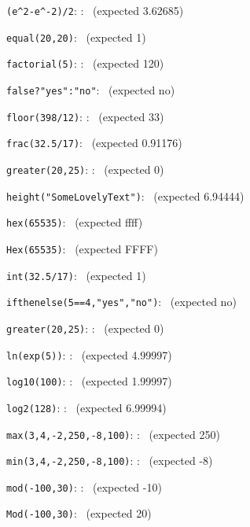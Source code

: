 \documentclass{article}
\begin{document}
\verb|(e^2-e^-2)/2|:
    :
   \pgfmathresult\ (expected  3.62685)

\verb|equal(20,20)|:
   \pgfmathresult\ (expected  1)

\verb|factorial(5)|:
    :
   \pgfmathresult\ (expected  120)

\verb|false?"yes":"no"|:
   \pgfmathresult\ (expected  no)

\verb|floor(398/12)|:
    :
   \pgfmathresult\ (expected  33)

\verb|frac(32.5/17)|:
   \pgfmathresult\ (expected  0.91176)

\verb|greater(20,25)|:
    :
   \pgfmathresult\ (expected  0)

\verb|height("SomeLovelyText")|:
   \pgfmathresult\ (expected  6.94444)

\verb|hex(65535)|:
   \pgfmathresult\ (expected  ffff)

\verb|Hex(65535)|:
   \pgfmathresult\ (expected  FFFF)

\verb|int(32.5/17)|:
   \pgfmathresult\ (expected  1)

\verb|ifthenelse(5==4,"yes","no")|:
   \pgfmathresult\ (expected  no)

\verb|greater(20,25)|:
    :
   \pgfmathresult\ (expected  0)

\verb|ln(exp(5))|:
    :
   \pgfmathresult\ (expected  4.99997)

\verb|log10(100)|:
    :
   \pgfmathresult\ (expected  1.99997)

\verb|log2(128)|:
    :
   \pgfmathresult\ (expected  6.99994)

\verb|max(3,4,-2,250,-8,100)|:
    :
   \pgfmathresult\ (expected  250)

\verb|min(3,4,-2,250,-8,100)|:
    :
   \pgfmathresult\ (expected  -8)

\verb|mod(-100,30)|:
    :
   \pgfmathresult\ (expected  -10)

\verb|Mod(-100,30)|:
   \pgfmathresult\ (expected  20)
\end{document}
